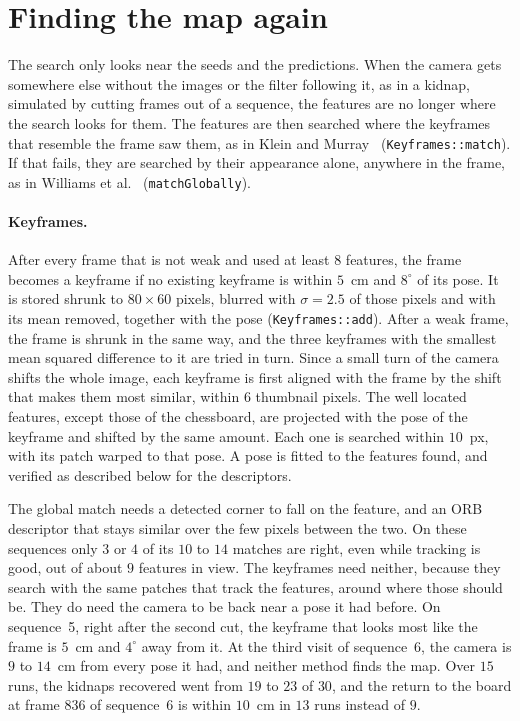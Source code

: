\documentclass[11pt]{article}
\begin{document}
\section{Finding the map again}
\label{sec:global}

The search only looks near the seeds and the predictions. When the camera gets somewhere else
without the images or the filter following it, as in a kidnap, simulated by cutting frames out of a
sequence, the features are no longer where the search looks for them. The features are then searched where the keyframes
that resemble the frame saw them, as in Klein and Murray~\cite{klein2008}
(\texttt{Keyframes::match}). If that fails, they are searched by their appearance alone,
anywhere in the frame, as in Williams et al.~\cite{williams2011} (\texttt{matchGlobally}).

\paragraph{Keyframes.}
After every frame that is not weak and used at least $8$ features, the frame becomes a keyframe if
no existing keyframe is within $5$~cm and $8^\circ$ of its pose. It is stored shrunk to
$80 \times 60$ pixels, blurred with $\sigma = 2.5$ of those pixels and with its mean removed,
together with the pose (\texttt{Keyframes::add}). After a weak frame, the frame is shrunk in the
same way, and the three keyframes with the smallest mean squared difference to it are tried in
turn. Since a small turn of the camera shifts the whole image, each keyframe is first aligned with the
frame by the shift that makes them most similar, within $6$ thumbnail pixels. The well located
features, except those of the chessboard, are projected with the pose of the keyframe and shifted
by the same amount. Each one is searched within $10$~px, with its patch warped to that pose. A pose is fitted to the features
found, and verified as described below for the descriptors.

The global match needs a detected corner to fall on the feature, and an ORB descriptor that stays
similar over the few pixels between the two. On these sequences only $3$ or $4$ of its $10$ to $14$ matches are
right, even while tracking is good, out of about $9$ features in view. The keyframes need neither,
because they search with the same patches that track the features, around where those should be.
They do need the camera to be back near a pose it had before. On sequence~5, right after the second
cut, the keyframe that looks most like the frame is $5$~cm and $4^\circ$ away from it. At the third
visit of sequence~6, the camera is $9$ to $14$~cm from every pose it had, and neither method finds
the map. Over $15$ runs, the kidnaps recovered went from $19$ to $23$ of $30$, and the return to the
board at frame $836$ of sequence~6 is within $10$~cm in $13$ runs instead of $9$.
\end{document}
